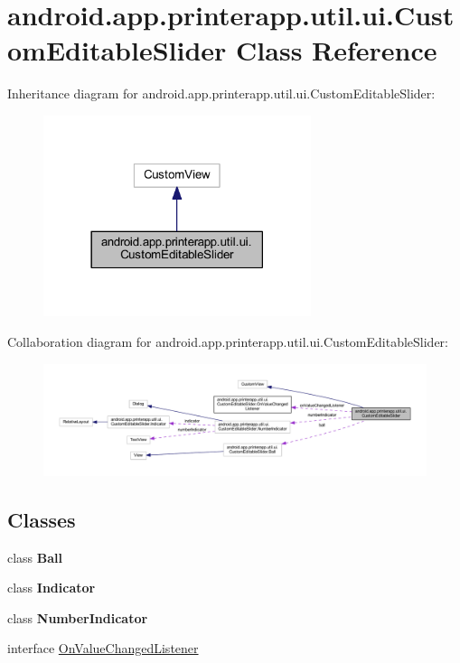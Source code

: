 \hypertarget{classandroid_1_1app_1_1printerapp_1_1util_1_1ui_1_1_custom_editable_slider}{}\section{android.\+app.\+printerapp.\+util.\+ui.\+Custom\+Editable\+Slider Class Reference}
\label{classandroid_1_1app_1_1printerapp_1_1util_1_1ui_1_1_custom_editable_slider}


Inheritance diagram for android.\+app.\+printerapp.\+util.\+ui.\+Custom\+Editable\+Slider\+:
\nopagebreak
\begin{figure}[H]
\begin{center}
\leavevmode
\includegraphics[width=222pt]{classandroid_1_1app_1_1printerapp_1_1util_1_1ui_1_1_custom_editable_slider__inherit__graph}
\end{center}
\end{figure}


Collaboration diagram for android.\+app.\+printerapp.\+util.\+ui.\+Custom\+Editable\+Slider\+:
\nopagebreak
\begin{figure}[H]
\begin{center}
\leavevmode
\includegraphics[width=350pt]{classandroid_1_1app_1_1printerapp_1_1util_1_1ui_1_1_custom_editable_slider__coll__graph}
\end{center}
\end{figure}
\subsection*{Classes}
\begin{DoxyCompactItemize}
\item 
class {\bfseries Ball}
\item 
class {\bfseries Indicator}
\item 
class {\bfseries Number\+Indicator}
\item 
interface \hyperlink{interfaceandroid_1_1app_1_1printerapp_1_1util_1_1ui_1_1_custom_editable_slider_1_1_on_value_changed_listener}{On\+Value\+Changed\+Listener}
\end{DoxyCompactItemize}
